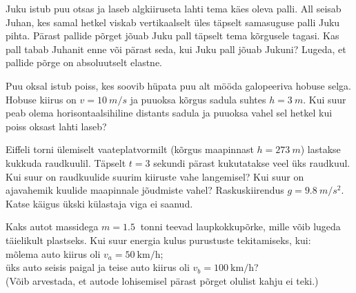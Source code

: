 \documentclass[10pt, twoside]{article}
\begin{document}
{%

Juku istub puu otsas ja laseb algkiiruseta lahti tema käes oleva palli. All seisab Juhan, kes samal hetkel viskab vertikaalselt üles täpselt samasuguse palli Juku pihta. Pärast pallide põrget jõuab Juku pall täpselt tema kõrgusele tagasi. Kas pall tabab Juhanit enne või pärast seda, kui Juku pall jõuab Jukuni? Lugeda, et pallide põrge on absoluutselt elastne.
\probend
\bigskip


Puu oksal istub poiss, kes soovib hüpata puu alt mööda galopeeriva hobuse selga. Hobuse kiirus on $v = \SI{10}{m/s}$ ja puuoksa kõrgus sadula suhtes $h = \SI{3}{m}$. Kui suur peab olema horisontaalsihiline distants sadula ja puuoksa vahel sel hetkel kui poiss oksast lahti laseb?
\probend
\bigskip


Eiffeli torni ülemiselt vaateplatvormilt (kõrgus maapinnast
$h=\SI{273}{m}$) lastakse kukkuda raudkuulil. Täpselt $t=3$ sekundi pärast kukutatakse
veel üks raudkuul. Kui suur on raudkuulide suurim
kiiruste vahe langemisel? Kui suur on ajavahemik kuulide maapinnale jõudmiste
vahel? Raskuskiirendus $g=\SI{9.8}{m/s^2}$. Katse käigus ükski külastaja viga ei saanud.
\probend
\bigskip


Kaks autot massidega $m=\SI{1,5}{}$ tonni teevad laupkokkupõrke, mille võib lugeda täielikult plastseks. Kui suur energia kulus purustuste tekitamiseks, kui:\\
\osa mõlema auto kiirus oli $v_a=\SI{50}{\kilo\metre\per\hour}$; \\
\osa üks auto seisis paigal ja teise auto kiirus oli $v_b=\SI{100}{\kilo\metre\per\hour}$?\\
(Võib arvestada, et autode lohisemisel pärast põrget olulist kahju ei teki.)
\probend
\bigskip


}
\end{document}
